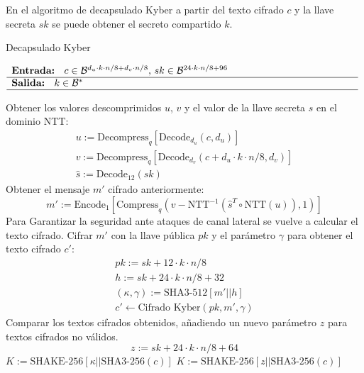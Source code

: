 En el algoritmo de decapsulado Kyber a partir del texto cifrado \(c\)  y la llave secreta \(sk\) se puede obtener el secreto compartido \(k\).
\begin{algorithm}[H]
	\small
	\caption{Decapsulado Kyber}
	$\begin{array}{p{\textwidth}}
		\textbf{Entrada: } \(c\in \mathcal{B}^{d_u\cdot k\cdot n/8+d_v\cdot n/8}\), \(sk\in \mathcal{B}^{24\cdot k\cdot n/8+96}\)\\ 
		\hline
		\textbf{Salida: } \(k\in \mathcal{B}^{*}\)\\ 
		\hline
	\end{array}$
	\begin{algorithmic}[1]
		\State Obtener los valores descomprimidos \(u\), \(v\) y el valor de la llave secreta \(s\) en el dominio NTT:
		\begin{equation}
			\begin{array}{l}
				u:=\text{Decompress}_q[\text{Decode}_{d_u}(c,d_u)]\\
				v:=\text{Decompress}_q[\text{Decode}_{d_v}(c+d_u\cdot k\cdot n/8,d_v)]\\
				\hat{s}:=\text{Decode}_{12}(sk)
			\end{array}
		\end{equation}
		\State Obtener el mensaje \(m'\) cifrado anteriormente:
		\begin{equation}
			m':=\text{Encode}_1[\text{Compress}_q\left(v-\text{NTT}^{-1}(\hat{s}^T\circ \text{NTT}(u)),1\right)]
		\end{equation}
		\Statex Para Garantizar la seguridad ante ataques de canal lateral se vuelve a calcular el texto cifrado.
		\State Cifrar \(m'\) con la llave pública \(pk\) y el parámetro \(\gamma\) para obtener el texto cifrado \(c'\):
		\begin{equation}
			\begin{array}{l}
				pk:=sk+12\cdot k\cdot n/8\\
				h:=sk+24\cdot k\cdot n/8+32\\
				(\kappa, \gamma):=\text{SHA3-512}[m'||h]\\
				c'\gets \text{Cifrado Kyber}(pk,m',\gamma)
			\end{array}
		\end{equation}
		\State Comparar los textos cifrados obtenidos, añadiendo un nuevo parámetro \(z\) para textos cifrados no válidos.
		\begin{equation}
			z:=sk+24\cdot k \cdot n/8 +64
		\end{equation}
		\State \Return \(K:=\text{SHAKE-256}[\kappa||\text{SHA3-256}(c)]\) 
		\Else
		\State \Return \(K:=\text{SHAKE-256}[z||\text{SHA3-256}(c)]\) 
		\EndIf
	\end{algorithmic}
\end{algorithm}
\newpage

